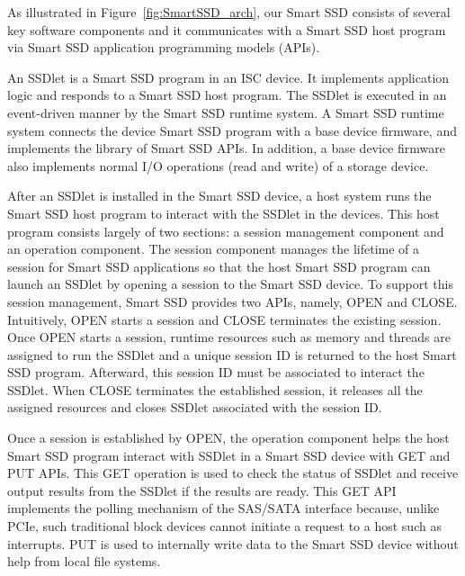 As illustrated in Figure~\ref{fig:SmartSSD_arch}, our Smart SSD consists of several key software components and it communicates with a Smart SSD host program via Smart SSD application programming models (APIs).


An SSDlet is a Smart SSD program in an ISC device. It implements application logic and responds to a Smart SSD host program. The SSDlet is executed in an event-driven manner by the Smart SSD runtime system. A Smart SSD runtime system connects the device Smart SSD program with a base device firmware, and implements the library of Smart SSD APIs. In addition, a base device firmware also implements normal I/O operations (read and write) of a storage device.

After an SSDlet is installed in the Smart SSD device, a host system runs the Smart SSD host program to interact with the SSDlet in the devices. This host program consists largely of two sections: a session management component and an operation component. The session component manages the lifetime of a session for Smart SSD applications so that the host Smart SSD program can launch an SSDlet by opening a session to the Smart SSD device. To support this session management, Smart SSD provides two APIs, namely, OPEN and CLOSE. Intuitively, OPEN starts a session and CLOSE terminates the existing session. Once OPEN starts a session, runtime resources such as memory and threads are assigned to run the SSDlet and a unique session ID is returned to the host Smart SSD program. Afterward, this session ID must be associated to interact the SSDlet. When CLOSE terminates the established session, it releases all the assigned resources and closes SSDlet associated with the session ID.

Once a session is established by OPEN, the operation component helps the host Smart SSD program interact with SSDlet in a Smart SSD device with GET and PUT APIs. This GET operation is used to check the status of SSDlet and receive output results from the SSDlet if the results are ready. This GET API implements the polling mechanism of the SAS/SATA interface because, unlike PCIe, such traditional block devices cannot initiate a request to a host such as interrupts. PUT is used to internally write data to the Smart SSD device without help from local file systems.


